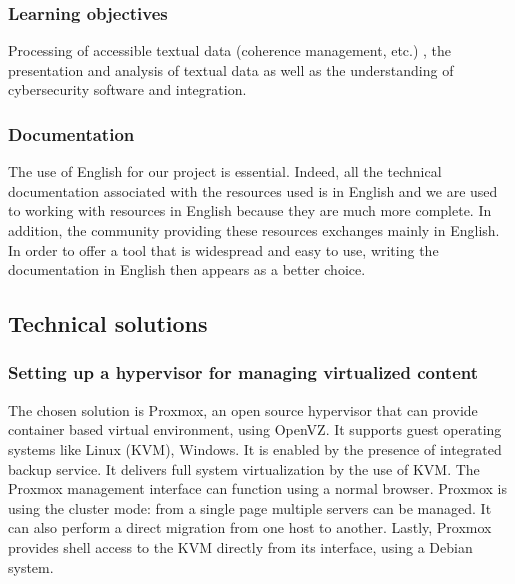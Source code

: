 \vspace{0.5cm}
\subsubsection{Learning objectives}
Processing of accessible textual data (coherence management, etc.)
, the presentation and analysis of textual data as well as the understanding of cybersecurity
software and integration. \\



\vspace{0.5cm}
\subsubsection{Documentation}
The use of English for our project is essential. Indeed, all the technical
documentation associated with the resources used is in English and we are used
to working with resources in English because they are much more complete. In
addition, the community providing these resources exchanges mainly in English. In order
to offer a tool that is widespread and easy to use, writing the
documentation in English then appears as a better choice. \\


\pagebreak

\subsection{Technical solutions}

\vspace{1cm}
\subsubsection{Setting up a hypervisor for managing virtualized content}

The chosen solution is Proxmox, an open source hypervisor that can provide container based virtual environment, using OpenVZ.
It supports guest operating systems like Linux (KVM), Windows. It is enabled by the presence of integrated backup service.
It delivers full system virtualization by the use of KVM.
The Proxmox management interface can function using a normal browser.
Proxmox is using the cluster mode: from a single page multiple servers can be managed.
It can also perform a direct migration from one host to another.
Lastly, Proxmox provides shell access to the KVM directly from its interface, using a Debian system.

